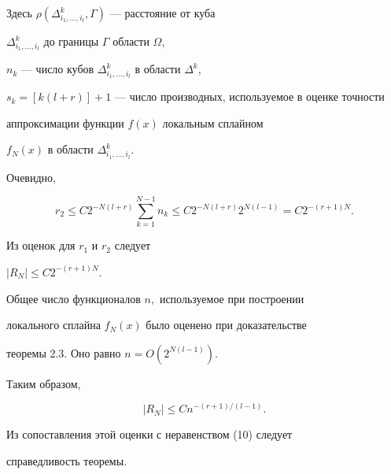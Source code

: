 \begin{pf}
Здесь $ \rho(\Delta^k_{i_1,\dotsc,i_l},\Gamma)$ --- расстояние от куба


$\Delta^k_{i_1,\dotsc,i_l}$ до границы $\Gamma $ области $\Omega$,


$n_k$ --- число кубов $\Delta_{i_1,\dotsc,i_l}^k $ в области $\Delta^k$,


$s_k=[k(l+r)]+1$ --- число производных, используемое в оценке точности


аппроксимации функции $f(x)$ локальным сплайном


$f_N(x)$ в области $\Delta^k_{i_1,\dotsc,i_l}.$


Очевидно,


$$


r_2 \le C2^{-N(l+r)}\sum_{k=1}^{N-1}n_k \le


C2^{-N(l+r)} 2^{N(l-1)}= C2^{-(r+1)N}.


$$


Из оценок для $r_1$ и $r_2$ следует


$|R_N|\le C2^{-(r+1)N}.$





Общее число функционалов $n,$ используемое при построении


локального сплайна $f_N(x)$ было оценено при доказательстве


теоремы 2.3. Оно равно $n=O(2^{N(l-1)}).$


Таким образом,


$$


|R_N| \le Cn^{-(r+1)/(l-1)}.


$$


Из сопоставления этой оценки с неравенством (10) следует


справедливость теоремы.


\end{pf}





